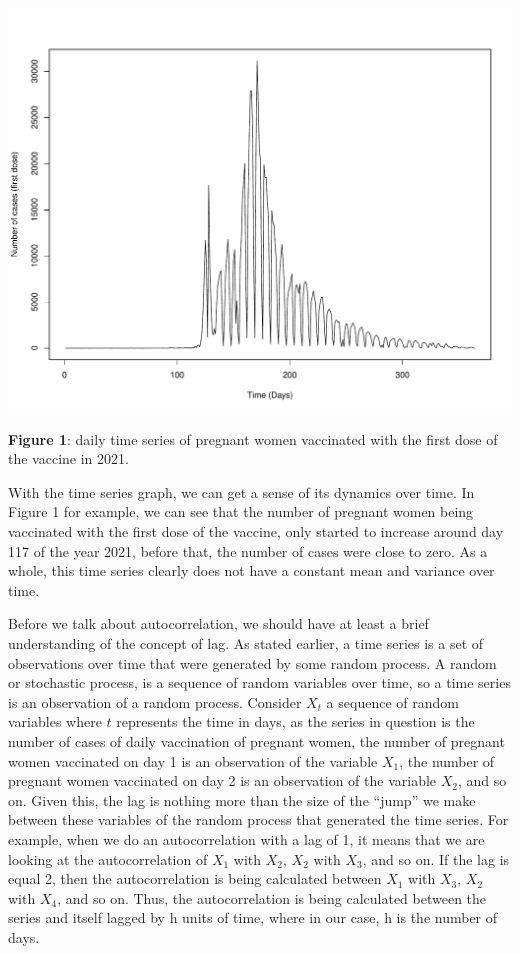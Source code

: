 \documentclass[
]{article}
\begin{document}
\begin{center}\includegraphics[width=\linewidth]{IF_results_ENG_files/figure-latex/unnamed-chunk-1-1} \end{center}

\textbf{Figure 1}: daily time series of pregnant women vaccinated with
the first dose of the vaccine in 2021.

With the time series graph, we can get a sense of its dynamics over
time. In Figure 1 for example, we can see that the number of pregnant
women being vaccinated with the first dose of the vaccine, only started
to increase around day 117 of the year 2021, before that, the number of
cases were close to zero. As a whole, this time series clearly does not
have a constant mean and variance over time.

Before we talk about autocorrelation, we should have at least a brief
understanding of the concept of lag. As stated earlier, a time series is
a set of observations over time that were generated by some random
process. A random or stochastic process, is a sequence of random
variables over time, so a time series is an observation of a random
process. Consider \(X_t\) a sequence of random variables where \(t\)
represents the time in days, as the series in question is the number of
cases of daily vaccination of pregnant women, the number of pregnant
women vaccinated on day 1 is an observation of the variable \(X_1\), the
number of pregnant women vaccinated on day 2 is an observation of the
variable \(X_2\), and so on. Given this, the lag is nothing more than
the size of the ``jump'' we make between these variables of the random
process that generated the time series. For example, when we do an
autocorrelation with a lag of 1, it means that we are looking at the
autocorrelation of \(X_1\) with \(X_2\), \(X_2\) with \(X_3\), and so
on. If the lag is equal 2, then the autocorrelation is being calculated
between \(X_1\) with \(X_3\), \(X_2\) with \(X_4\), and so on. Thus, the
autocorrelation is being calculated between the series and itself lagged
by h units of time, where in our case, h is the number of days.
\end{document}
